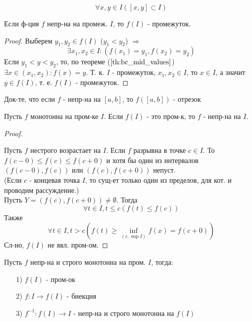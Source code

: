 \[
\forall x, y \in I ([x, y] \subset I)
\]
\begin{consequence}
  \label{cs:cs_th7}
Если ф-ция $f$ непр-на на промеж. $I$, то $f(I)$ - промежуток.
\end{consequence}
\begin{proof}
Выберем $y_1, y_2 \in f(I)$ ($y_1 < y_2$) $\Rightarrow$
\[
  \exists x_1, x_2 \in I \colon (f(x_1) = y_1, f(x_2) = y_2)
\]
Если $y_1 < y < y_2$, то, по теореме ($\ref{th:bc_mid_values}$) $ \exists x \in (x_1, x_2) \colon f(x) = y$. Т. к. $I$ - промежуток, $x_1, x_2 \in I$, то $x \in I$, а значит $y \in f(I)$, т. е. $f(I)$ - промежуток.
\end{proof}
\begin{task}
Док-те, что если $f$ - непр-на на $[a, b]$, то $f([a, b])$ - отрезок
\end{task}
\begin{lemma}
  Пусть $f$ монотонна на пром-ке $I$. Если $f(I)$ - это пром-к, то $f$ - непр-на на $I$.
\end{lemma}
\begin{proof}
~\newline

Пусть $f$ нестрого возрастает на $I$. Если $f$ разрывна в точке $c \in I$. То $f(c - 0) \leq f(c) \leq f(c + 0)$ и хотя бы один из интервалов $(f(c - 0), f(c))$ или $(f(c), f(c + 0))$ непуст.\\

(Если $c$ - концевая точка $I$, то сущ-ет только один из пределов, для кот. и проводим рассуждение.) \\
Пусть $Y = (f(c), f(c + 0)) \neq \emptyset$. Тогда
\[
  \forall t \in I, t \leq c (f(t) \leq f(c))
\]
Также
\[
  \forall t \in I, t > c (f(t) \geq \underset{(c, \sup I)}{\inf} f(x) = f(c + 0))
\]
Сл-но, $f(I)$ не явл. пром-ом.
\end{proof}
\begin{theorem}
  \label{th:rev_func_th}
  Пусть $f$ непр-на и строго монотонна на пром. $I$, тогда:
  \begin{itemize}
    \item [1) ] $f(I)$ - пром-ок
    \item [2) ] $f: I \rightarrow f(I)$ - биекция
    \item [3) ] $f^{-1}: f(I) \rightarrow I$ - непр-на и строго монотонна на $f(I)$
\end{itemize}
\end{theorem}
